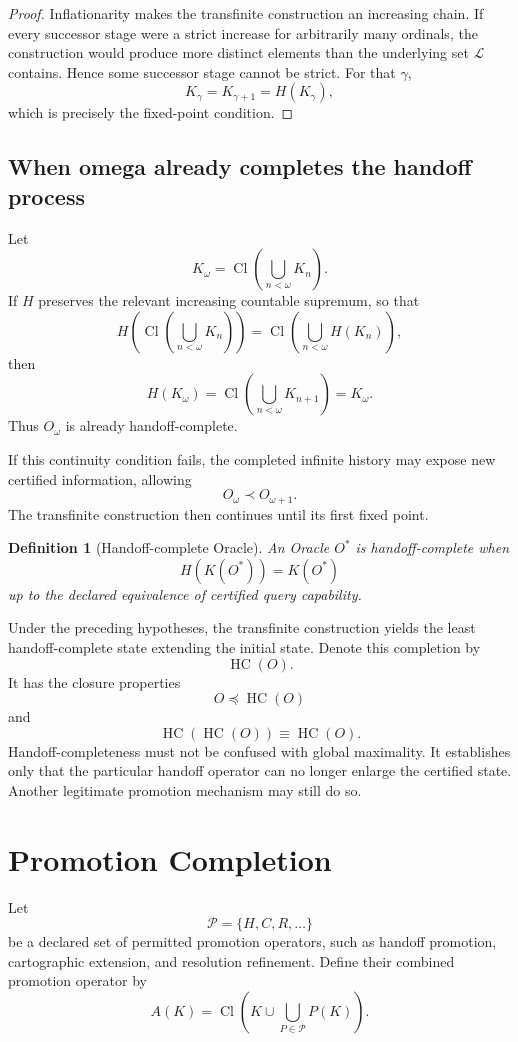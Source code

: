 \documentclass[11pt]{article}
\newtheorem{definition}[theorem]{Definition}
\newcommand{\Cl}{\operatorname{Cl}}
\newcommand{\HC}{\operatorname{HC}}
\begin{document}
\begin{proof}
Inflationarity makes the transfinite construction an increasing chain. If every successor stage were a strict increase for arbitrarily many ordinals, the construction would produce more distinct elements than the underlying set $\mathcal L$ contains. Hence some successor stage cannot be strict. For that $\gamma$,
\[
K_\gamma=K_{\gamma+1}=H(K_\gamma),
\]
which is precisely the fixed-point condition.
\end{proof}

\subsection{When omega already completes the handoff process}
Let
\[
K_\omega=\Cl\left(\bigcup_{n<\omega}K_n\right).
\]
If $H$ preserves the relevant increasing countable supremum, so that
\[
H\left(\Cl\left(\bigcup_{n<\omega}K_n\right)\right)
=\Cl\left(\bigcup_{n<\omega}H(K_n)\right),
\]
then
\[
H(K_\omega)=\Cl\left(\bigcup_{n<\omega}K_{n+1}\right)=K_\omega.
\]
Thus $O_\omega$ is already handoff-complete.

If this continuity condition fails, the completed infinite history may expose new certified information, allowing
\[
O_\omega\prec O_{\omega+1}.
\]
The transfinite construction then continues until its first fixed point.

\begin{definition}[Handoff-complete Oracle]
An Oracle $O^*$ is handoff-complete when
\[
H(K(O^*))=K(O^*)
\]
up to the declared equivalence of certified query capability.
\end{definition}

Under the preceding hypotheses, the transfinite construction yields the least handoff-complete state extending the initial state. Denote this completion by
\[
\HC(O).
\]
It has the closure properties
\[
O\preceq\HC(O)
\]
and
\[
\HC(\HC(O))\equiv\HC(O).
\]
Handoff-completeness must not be confused with global maximality. It establishes only that the particular handoff operator can no longer enlarge the certified state. Another legitimate promotion mechanism may still do so.

\section{Promotion Completion}
Let
\[
\mathcal P=\{H,C,R,\ldots\}
\]
be a declared set of permitted promotion operators, such as handoff promotion, cartographic extension, and resolution refinement. Define their combined promotion operator by
\[
A(K)=\Cl\left(K\cup\bigcup_{P\in\mathcal P}P(K)\right).
\]
\end{document}
